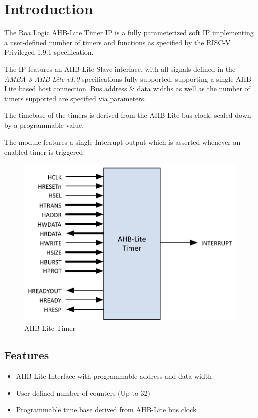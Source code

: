 \chapter{Introduction} \label{introduction}

The Roa Logic AHB-Lite Timer IP is a fully parameterized soft IP
implementing a user-defined number of timers and functions as specified
by the RISC-V Privileged 1.9.1 specification.

The IP features an AHB-Lite Slave interface, with all signals defined in
the \emph{AMBA 3 AHB-Lite v1.0} specifications fully supported,
supporting a single AHB-Lite based host connection. Bus address \& data
widths as well as the number of timers supported are specified via
parameters.

The timebase of the timers is derived from the AHB-Lite bus clock,
scaled down by a programmable value.

The module features a single Interrupt output which is asserted whenever
an enabled timer is triggered

\begin{figure}[tbh]
	\includegraphics{assets/img/AHB-Lite-Timer-sig.png}
	\caption{AHB-Lite Timer}
	\label{fig:ahb-lite-timer-sig}
\end{figure}

\section{Features}\label{features}

\begin{itemize}
\item
  AHB-Lite Interface with programmable address and data width
\item
  User defined number of counters (Up to 32)
\item
  Programmable time base derived from AHB-Lite bus clock
\end{itemize}
